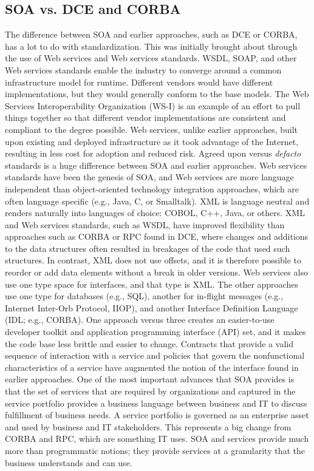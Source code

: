 \documentclass[12pt,a4paper,final,twoside,onecolumn,titlepage]{book}
\begin{document}
\subsection{SOA vs. DCE and CORBA}
The difference between \gls{SOA} and earlier approaches, such as \gls{DCE} or \gls{CORBA}, has a lot to do with standardization. This was initially brought about through the use of Web services and Web services standards. \gls{WSDL}, \gls{SOAP}, and other Web services standards enable the industry to converge around a common infrastructure model for runtime. Different vendors would have different implementations, but they would generally conform to the base models. The Web Services Interoperability Organization (WS-I) is an example of an effort to pull things together so that different vendor implementations are consistent and compliant to the degree possible. Web services, unlike earlier approaches, built upon existing and deployed infrastructure as it took advantage of the Internet, resulting in less cost for adoption and reduced risk.
Agreed upon versus \textit{defacto} standards is a huge difference between \gls{SOA} and earlier approaches. Web services standards have been the genesis of \gls{SOA}, and Web services are more language independent than object-oriented technology integration approaches, which are often language specific (e.g., Java, C, or Smalltalk). \gls{XML} is language neutral and renders naturally into languages of choice: COBOL, C++, Java, or others. \gls{XML} and Web services standards, such as \gls{WSDL}, have improved flexibility than approaches such as \gls{CORBA} or \gls{RPC} found in \gls{DCE}, where changes and additions to the data structures often resulted in breakages of the code that used such structures. In contrast, \gls{XML} does not use offsets, and it is therefore possible to reorder or add data elements without a break in older versions. Web services also use one type space for interfaces, and that type is \gls{XML}. The other approaches use one type for databases (e.g., SQL), another for in-flight messages (e.g., Internet Inter-Orb Protocol, IIOP), and another Interface Definition Language (IDL; e.g., CORBA). One approach versus three creates an easier-to-use developer toolkit and application programming interface (API) set, and it makes the code base less brittle and easier to change. Contracts that provide a valid sequence of interaction with a service and policies that govern the nonfunctional characteristics of a service have augmented the notion of the interface found in earlier approaches.
One of the most important advances that \gls{SOA} provides is that the set of services that are required by organizations and captured in the service portfolio provides a business language between business and IT to discuss fulfillment of business needs. A service portfolio is governed as an enterprise asset and used by business and IT stakeholders. This represents a big change from CORBA and \gls{RPC}, which are something IT uses. \gls{SOA} and services provide much more than programmatic notions; they provide services at a granularity that the business understands and can use.
\end{document}
